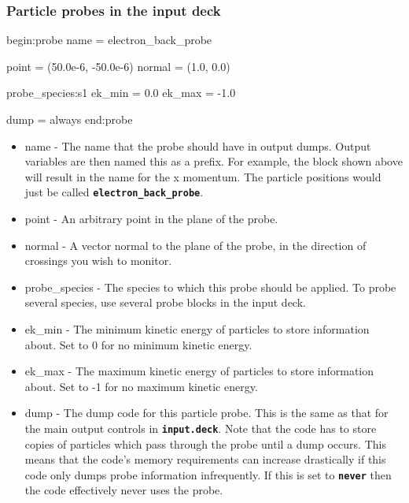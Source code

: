 \documentclass[12pt,a4paper]{article}
\newcommand{\inlinecode}[1]{{\color{warwickred} \bf\texttt{#1}}}
\newenvironment{boxverbatim}{\lboxverbatim{none}}{\endlboxverbatim}
\begin{document}
\subsubsection{Particle probes in the input deck}
\begin{boxverbatim}
begin:probe
   name = electron_back_probe

   point = (50.0e-6, -50.0e-6)
   normal = (1.0, 0.0)

   probe_species:s1
   ek_min = 0.0
   ek_max = -1.0

   dump = always
end:probe
\end{boxverbatim}
\begin{itemize}
\item name - The name that the probe should have in output dumps. Output
  variables are then named this as a prefix. For example, the block shown above
  will result in the name\linebreak \inlinecode{electron\_back\_probe\_px} for
  the x momentum. The particle positions would just be called\linebreak
  \inlinecode{electron\_back\_probe}.
\item point - An arbitrary point in the plane of the probe.
\item normal - A vector normal to the plane of the probe, in the direction
  of crossings you wish to monitor.
\item probe\_species - The species to which this probe should be
  applied. To probe several species, use several probe blocks in the input
  deck.
\item ek\_min - The minimum kinetic energy of particles to store information
  about. Set to 0 for no minimum kinetic energy.
\item ek\_max - The maximum kinetic energy of particles to store information
  about. Set to -1 for no maximum kinetic energy.
\item dump - The dump code for this particle probe. This is the same as that
  for the main output controls in \inlinecode{input.deck}. Note that the code
  has to store copies of particles which pass through the probe until a dump
  occurs. This means that the code's memory requirements can increase
  drastically if this code only dumps probe information infrequently. If this
  is set to \inlinecode{never} then the code effectively never uses the probe.
\end{itemize}
\end{document}
